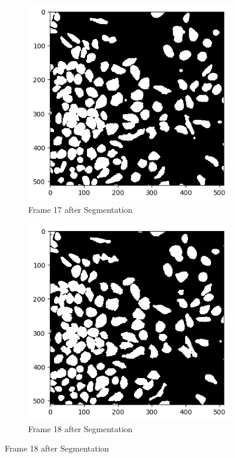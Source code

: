 \documentclass{article}
\begin{document}
\begin{figure}[h!]
  \begin{subfigure}{0.4\textwidth}
    \includegraphics[width=\linewidth]{Report/Appendix_Images/Segmentation-A-Control/frame_17.png}
    \caption*{Frame 17 after Segmentation}
  \end{subfigure}
  \hfill
  \begin{subfigure}{0.4\textwidth}
    \includegraphics[width=\linewidth]{Report/Appendix_Images/Segmentation-A-Control/frame_18.png}
    \caption*{Frame 18 after Segmentation}
  \end{subfigure}
\end{figure}
\end{document}
